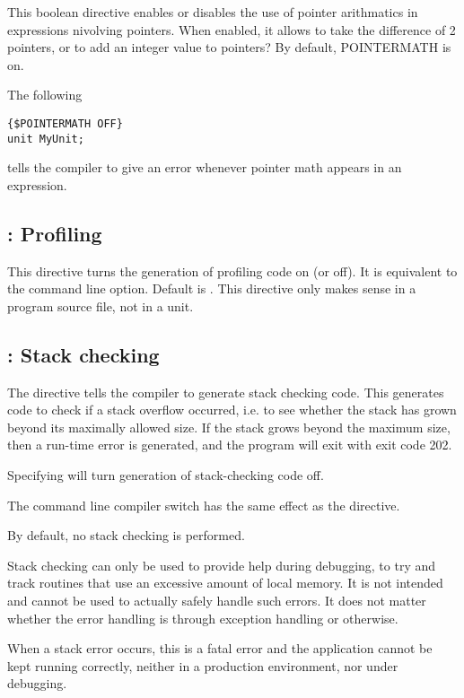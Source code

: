 This boolean directive enables or disables the use of pointer arithmatics in
expressions nivolving pointers. When enabled, it allows to take the
difference of 2 pointers, or to add an integer value to pointers?
By default, POINTERMATH is on.

The following 
\begin{verbatim}
{$POINTERMATH OFF}
unit MyUnit;
\end{verbatim}
tells the compiler to give an error whenever pointer math appears in an
expression.


\subsection{ : Profiling}

This directive turns the generation of profiling code on (or off). It is
equivalent to the  command line option. Default is . This
directive only makes sense in a program source file, not in a unit.


\subsection{ : Stack checking}

The  directive tells the compiler to generate stack checking
code. This generates code to check if a stack overflow occurred, i.e. to see
whether the stack has grown beyond its maximally allowed size. If the stack
grows beyond the maximum size, then a run-time error is generated, and the
program will exit with exit code 202.

Specifying  will turn generation of stack-checking code off.

The command line compiler switch  has the same effect as the
 directive.

By default, no stack checking is performed.

\begin{remark}
Stack checking can only be used to provide help during debugging, to try and 
track routines that use an excessive amount of local memory. It is not
intended and cannot be used to actually safely handle such errors.
It does not matter whether the error handling is through exception 
handling or otherwise.

When a stack error occurs, this is a fatal error and the application cannot 
be kept running correctly, neither in a production environment, nor under 
debugging. 
\end{remark}

